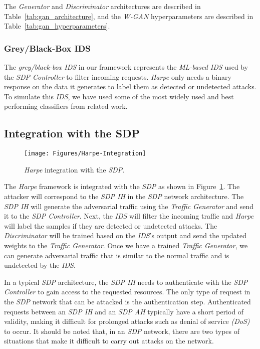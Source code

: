 The \textit{Generator} and \textit{Discriminator} architectures are described in Table~\ref{tab:gan_architecture},
and the \textit{W-GAN} hyperparameters are described in Table~\ref{tab:gan_hyperparameters}.

\subsubsection{Grey/Black-Box IDS}
The \textit{grey/black-box IDS} in our framework represents the \textit{ML-based IDS} used by the
\textit{SDP Controller} to filter incoming requests.
\textit{Harpe} only needs a binary response on the data it generates to label them as detected or undetected attacks.
To simulate this \textit{IDS}, we have used some of the most widely used and best performing classifiers from related
work.

\subsection{Integration with the SDP}\label{subsec:integration-with-the-sdp}

\begin{figure}
    \centering
    \texttt{[image: Figures/Harpe-Integration]}
    \caption{\label{fig:harpe-sdp-integration} \textit{Harpe} integration with the \textit{SDP}.}
\end{figure}

The \textit{Harpe} framework is integrated with the \textit{SDP} as shown in Figure~\ref{fig:harpe-sdp-integration}.
The attacker will correspond to the \textit{SDP IH} in the \textit{SDP} network architecture.
The \textit{SDP IH} will generate the adversarial traffic using the \textit{Traffic Generator} and send it to the
\textit{SDP Controller}.
Next, the \textit{IDS} will filter the incoming traffic and \textit{Harpe} will label the samples if they are
detected or undetected attacks.
The \textit{Discriminator} will be trained based on the \textit{IDS}’s output and send the updated weights to the
\textit{Traffic Generator}.
Once we have a trained \textit{Traffic Generator}, we can generate adversarial traffic that is similar to the
normal traffic and is undetected by the \textit{IDS}.

In a typical \textit{SDP} architecture, the \textit{SDP IH} needs to authenticate with the \textit{SDP Controller} to
gain access to the requested resources.
The only type of request in the \textit{SDP} network that can be attacked is the authentication step.
Authenticated requests between an \textit{SDP IH} and an \textit{SDP AH} typically have a short period of validity,
making it difficult for prolonged attacks such as denial of service \textit{(DoS)} to occur.
It should be noted that, in an \textit{SDP} network, there are two types of situations that make it difficult to carry
out attacks on the network.

